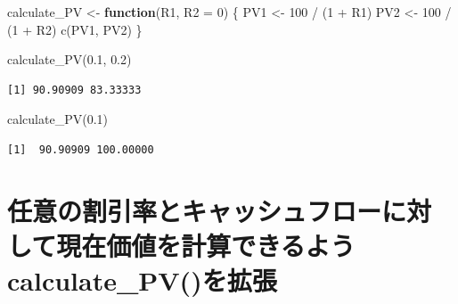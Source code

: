 \documentclass[
  letterpaper,
  DIV=11,
  numbers=noendperiod]{scrreprt}
\newenvironment{Shaded}{\begin{snugshade}}{\end{snugshade}}
\newcommand{\AttributeTok}[1]{\textcolor[rgb]{0.40,0.45,0.13}{#1}}
\newcommand{\ControlFlowTok}[1]{\textcolor[rgb]{0.00,0.23,0.31}{\textbf{#1}}}
\newcommand{\DecValTok}[1]{\textcolor[rgb]{0.68,0.00,0.00}{#1}}
\newcommand{\FloatTok}[1]{\textcolor[rgb]{0.68,0.00,0.00}{#1}}
\newcommand{\FunctionTok}[1]{\textcolor[rgb]{0.28,0.35,0.67}{#1}}
\newcommand{\NormalTok}[1]{\textcolor[rgb]{0.00,0.23,0.31}{#1}}
\newcommand{\OtherTok}[1]{\textcolor[rgb]{0.00,0.23,0.31}{#1}}
\newcommand{\SpecialCharTok}[1]{\textcolor[rgb]{0.37,0.37,0.37}{#1}}
\begin{document}
\begin{Shaded}
\begin{Highlighting}[]
\NormalTok{calculate\_PV }\OtherTok{\textless{}{-}} \ControlFlowTok{function}\NormalTok{(R1, }\AttributeTok{R2 =} \DecValTok{0}\NormalTok{) \{}
\NormalTok{  PV1 }\OtherTok{\textless{}{-}} \DecValTok{100} \SpecialCharTok{/}\NormalTok{ (}\DecValTok{1} \SpecialCharTok{+}\NormalTok{ R1)}
\NormalTok{  PV2 }\OtherTok{\textless{}{-}} \DecValTok{100} \SpecialCharTok{/}\NormalTok{ (}\DecValTok{1} \SpecialCharTok{+}\NormalTok{ R2)}
  \FunctionTok{c}\NormalTok{(PV1, PV2)}
\NormalTok{\}}

\FunctionTok{calculate\_PV}\NormalTok{(}\FloatTok{0.1}\NormalTok{, }\FloatTok{0.2}\NormalTok{)}
\end{Highlighting}
\end{Shaded}

\begin{verbatim}
[1] 90.90909 83.33333
\end{verbatim}

\begin{Shaded}
\begin{Highlighting}[]
\FunctionTok{calculate\_PV}\NormalTok{(}\FloatTok{0.1}\NormalTok{)}
\end{Highlighting}
\end{Shaded}

\begin{verbatim}
[1]  90.90909 100.00000
\end{verbatim}

\section{任意の割引率とキャッシュフローに対して現在価値を計算できるようcalculate\_PV()を拡張}\label{ux4efbux610fux306eux5272ux5f15ux7387ux3068ux30adux30e3ux30c3ux30b7ux30e5ux30d5ux30edux30fcux306bux5bfeux3057ux3066ux73feux5728ux4fa1ux5024ux3092ux8a08ux7b97ux3067ux304dux308bux3088ux3046calculate_pvux3092ux62e1ux5f35}
\end{document}
